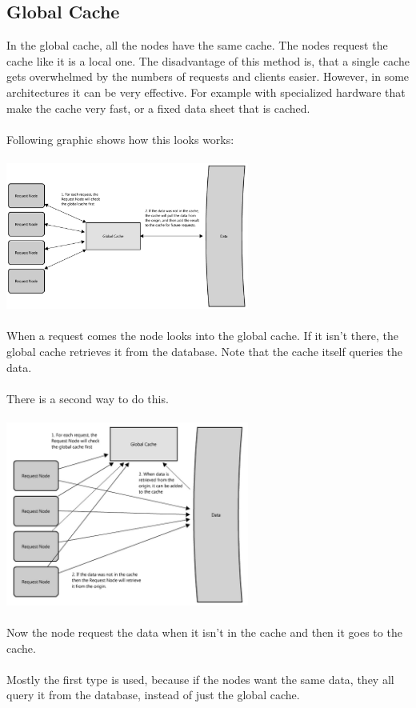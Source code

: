 \documentclass[12p]{article}
\begin{document}
	\subsection{Global Cache}
	In the global cache, all the nodes have the same cache. The nodes request the cache like it is a local one. The disadvantage of this method is, that a single cache gets overwhelmed by the numbers of requests and clients easier. However, in some architectures it can be very effective. For example with specialized hardware that make the cache very fast, or a fixed data sheet that is cached. \\\\
	Following graphic shows how this looks works: \\\\
	\includegraphics[width=0.6\textwidth]{img/global} \cite{cache} \\\\
	When a request comes the node looks into the global cache. If it isn't there, the global cache retrieves it from the database. Note that the cache itself queries the data. \\\\
	There is a second way to do this.\\\\
	 \includegraphics[width=0.6\textwidth]{img/global1} \cite{cache} \\\\
	Now the node request the data when it isn't in the cache and then it goes to the cache.\\\\
	Mostly the first type is used, because if the nodes want the same data, they all query it from the database, instead of just the global cache.
\end{document}
